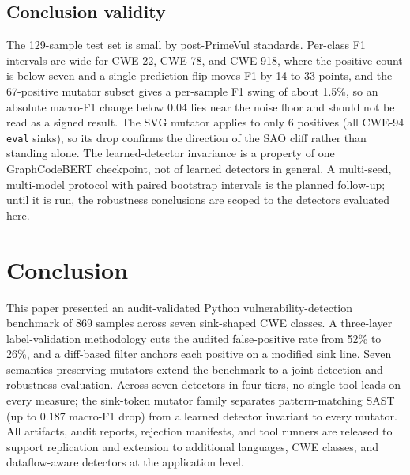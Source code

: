 \documentclass[conference]{IEEEtran}
\begin{document}
\subsection{Conclusion validity}
The 129-sample test set is small by post-PrimeVul standards. Per-class
F1 intervals are wide for CWE-22, CWE-78, and CWE-918, where the
positive count is below seven and a single prediction flip moves F1 by
14 to 33 points, and the 67-positive mutator subset gives a per-sample
F1 swing of about 1.5\%, so an absolute macro-F1 change below 0.04 lies
near the noise floor and should not be read as a signed result. The SVG
mutator applies to only 6 positives (all CWE-94 \texttt{eval} sinks), so
its drop confirms the direction of the SAO cliff rather than standing
alone. The learned-detector invariance is a property of one
GraphCodeBERT checkpoint, not of learned detectors in general. A
multi-seed, multi-model protocol with paired bootstrap intervals is the
planned follow-up; until it is run, the robustness conclusions are
scoped to the detectors evaluated here.

\section{Conclusion}
This paper presented an audit-validated Python vulnerability-detection
benchmark of 869 samples across seven sink-shaped CWE classes. A
three-layer label-validation methodology cuts the audited false-positive
rate from 52\% to 26\%, and a diff-based filter anchors each positive on
a modified sink line. Seven semantics-preserving mutators extend the
benchmark to a joint detection-and-robustness evaluation. Across seven
detectors in four tiers, no single tool leads on every measure; the
sink-token mutator family separates pattern-matching SAST (up to 0.187
macro-F1 drop) from a learned detector invariant to every mutator. All
artifacts, audit reports, rejection manifests, and tool runners are
released to support replication and extension to additional languages,
CWE classes, and dataflow-aware detectors at the application level.



\end{document}
